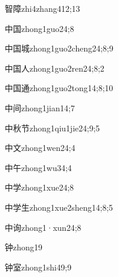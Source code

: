 \begin{verbete}{智障}{zhi4zhang4}{12;13}
\end{verbete}
\begin{verbete}{中国}{zhong1guo2}{4;8}
\end{verbete}
\begin{verbete}{中国城}{zhong1guo2cheng2}{4;8;9}
\end{verbete}
\begin{verbete}{中国人}{zhong1guo2ren2}{4;8;2}
\end{verbete}
\begin{verbete}{中国通}{zhong1guo2tong1}{4;8;10}
\end{verbete}
\begin{verbete}{中间}{zhong1jian1}{4;7}
\end{verbete}
\begin{verbete}{中秋节}{zhong1qiu1jie2}{4;9;5}
\end{verbete}
\begin{verbete}{中文}{zhong1wen2}{4;4}
\end{verbete}
\begin{verbete}{中午}{zhong1wu3}{4;4}
\end{verbete}
\begin{verbete}{中学}{zhong1xue2}{4;8}
\end{verbete}
\begin{verbete}{中学生}{zhong1xue2sheng1}{4;8;5}
\end{verbete}
\begin{verbete}{中询}{zhong1·xun2}{4;8}
\end{verbete}
\begin{verbete}{钟}{zhong1}{9}
\end{verbete}
\begin{verbete}{钟室}{zhong1shi4}{9;9}
\end{verbete}

